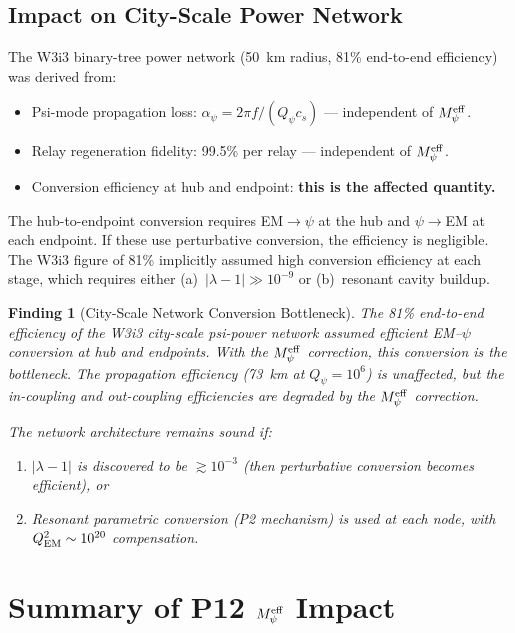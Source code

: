 \documentclass[aps,prd,twocolumn,superscriptaddress,nofootinbib]{revtex4-2}
\newcommand{\Qpsi}{Q_\psi}
\newcommand{\Meff}{M_\psi^{\rm eff}}
\newtheorem{finding}{Finding}
\begin{document}
\subsection{Impact on City-Scale Power Network}

The W3i3 binary-tree power network (50~km radius, 81\% end-to-end
efficiency) was derived from:
\begin{itemize}
\item Psi-mode propagation loss: $\alpha_\psi = 2\pi f/(Q_\psi c_s)$
  --- independent of $\Meff$.
\item Relay regeneration fidelity: 99.5\% per relay --- independent
  of $\Meff$.
\item Conversion efficiency at hub and endpoint: \textbf{this is the
  affected quantity.}
\end{itemize}

The hub-to-endpoint conversion requires EM$\to\psi$ at the hub and
$\psi\to$EM at each endpoint. If these use perturbative conversion,
the efficiency is negligible. The W3i3 figure of 81\% implicitly
assumed high conversion efficiency at each stage, which requires
either (a)~$|\lambda-1| \gg 10^{-9}$ or (b)~resonant cavity buildup.

\begin{finding}[City-Scale Network Conversion Bottleneck]
\label{find:network}
The 81\% end-to-end efficiency of the W3i3 city-scale psi-power
network \emph{assumed} efficient EM--$\psi$ conversion at hub and
endpoints. With the $\Meff$ correction, this conversion is the
bottleneck. The \emph{propagation} efficiency (73~km at $\Qpsi = 10^6$)
is unaffected, but the \emph{in-coupling} and \emph{out-coupling}
efficiencies are degraded by the $\Meff$ correction.

The network architecture remains sound if:
\begin{enumerate}
\item $|\lambda-1|$ is discovered to be $\gtrsim 10^{-3}$ (then
  perturbative conversion becomes efficient), or
\item Resonant parametric conversion (P2 mechanism) is used at each
  node, with $Q_{\rm EM}^2 \sim 10^{20}$ compensation.
\end{enumerate}
\end{finding}

\section{Summary of P12 $\Meff$ Impact}
\label{sec:P12_summary}
\end{document}
